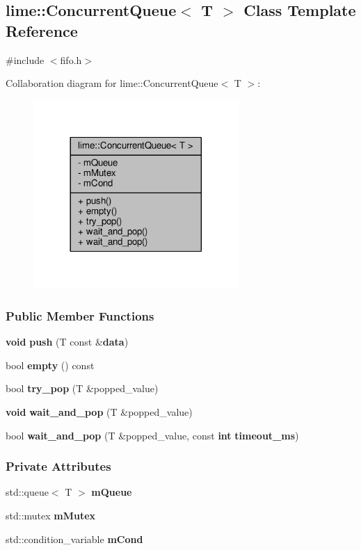 \subsection{lime\+:\+:Concurrent\+Queue$<$ T $>$ Class Template Reference}
\label{classlime_1_1ConcurrentQueue}


{\ttfamily \#include $<$fifo.\+h$>$}



Collaboration diagram for lime\+:\+:Concurrent\+Queue$<$ T $>$\+:
\nopagebreak
\begin{figure}[H]
\begin{center}
\leavevmode
\includegraphics[width=221pt]{d3/dba/classlime_1_1ConcurrentQueue__coll__graph}
\end{center}
\end{figure}
\subsubsection*{Public Member Functions}
\begin{DoxyCompactItemize}
\item 
{\bf void} {\bf push} (T const \&{\bf data})
\item 
bool {\bf empty} () const 
\item 
bool {\bf try\+\_\+pop} (T \&popped\+\_\+value)
\item 
{\bf void} {\bf wait\+\_\+and\+\_\+pop} (T \&popped\+\_\+value)
\item 
bool {\bf wait\+\_\+and\+\_\+pop} (T \&popped\+\_\+value, const {\bf int} {\bf timeout\+\_\+ms})
\end{DoxyCompactItemize}
\subsubsection*{Private Attributes}
\begin{DoxyCompactItemize}
\item 
std\+::queue$<$ T $>$ {\bf m\+Queue}
\item 
std\+::mutex {\bf m\+Mutex}
\item 
std\+::condition\+\_\+variable {\bf m\+Cond}
\end{DoxyCompactItemize}


